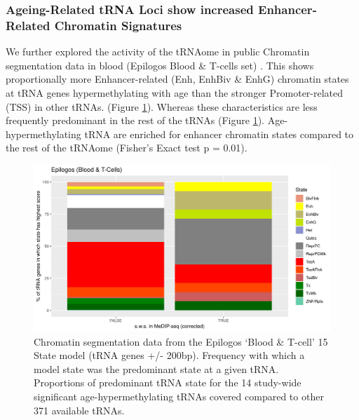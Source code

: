 \documentclass[
]{book}
\begin{document}
\hypertarget{ageing-related-trna-loci-show-increased-enhancer-related-chromatin-signatures}{%
\subsubsection{Ageing-Related tRNA Loci show increased Enhancer-Related Chromatin Signatures}\label{ageing-related-trna-loci-show-increased-enhancer-related-chromatin-signatures}}

We further explored the activity of the tRNAome in public Chromatin segmentation data in blood (Epilogos Blood \& T-cells set) \citep{Meuleman2019}.
This shows proportionally more Enhancer-related (Enh, EnhBiv \& EnhG) chromatin states at tRNA genes hypermethylating with age than the stronger Promoter-related (TSS) in other tRNAs. (Figure \ref{fig:combinedEpilogosPlot}).
Whereas these characteristics are less frequently predominant in the rest of the tRNAs (Figure \ref{fig:combinedEpilogosPlot}).
Age-hypermethylating tRNA are enriched for enhancer chromatin states compared to the rest of the tRNAome (Fisher's Exact test p = 0.01).

\begin{figure}

{\centering \includegraphics[width=0.9\linewidth]{./figs/maxScoreBytRNAtRNAge6SplitPlot_BL} 

}

\caption{Chromatin segmentation data from the Epilogos \citep{Meuleman2019} `Blood \& T-cell' 15 State model (tRNA genes +/- 200bp). Frequency with which a model state was the predominant state at a given tRNA. Proportions of predominant tRNA state for the 14 study-wide significant age-hypermethylating tRNAs covered compared to other 371 available tRNAs.}\label{fig:combinedEpilogosPlot}
\end{figure}
\end{document}
